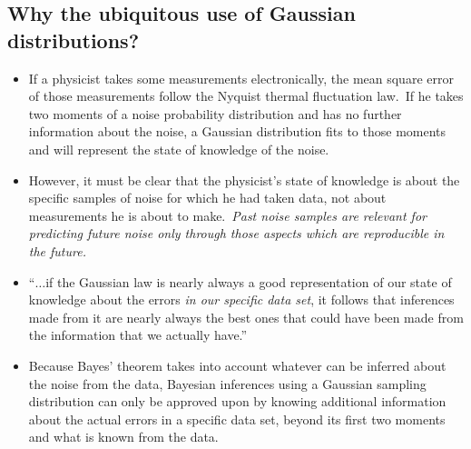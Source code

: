 \documentclass[../jaynes_prob_theory_notes.tex]{subfiles}
\begin{document}
        \subsection{Why the ubiquitous use of Gaussian distributions?}
            \begin{itemize}
                \item If a physicist takes some measurements electronically, the mean square error of those measurements follow the Nyquist thermal fluctuation law.\ If he takes two moments of a noise probability distribution and has no further information about the noise, a Gaussian distribution fits to those moments and will represent the state of knowledge of the noise.
                \item However, it must be clear that the physicist's state of knowledge is about the specific samples of noise for which he had taken data, not about measurements he is about to make.\ \textit{Past noise samples are relevant for predicting future noise only through those aspects which are reproducible in the future.}
                \item ``$\ldots$if the Gaussian law is nearly always a good representation of our state of knowledge about the errors \textit{in our specific data set}, it follows that inferences made from it are nearly always the best ones that could have been made from the information that we actually have.''
                \item Because Bayes' theorem takes into account whatever can be inferred about the noise from the data, Bayesian inferences using a Gaussian sampling distribution can only be approved upon by knowing additional information about the actual errors in a specific data set, beyond its first two moments and what is known from the data.
            \end{itemize}
\end{document}
